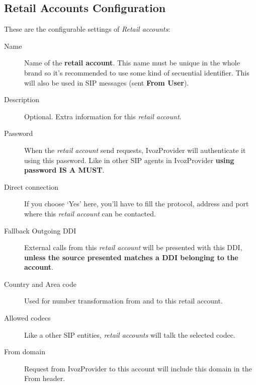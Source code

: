 \documentclass[letterpaper,10pt,english]{sphinxmanual}
\begin{document}
\subsection{Retail Accounts Configuration}
\label{retail/accounts:retail-accounts-configuration}
These are the configurable settings of \emph{Retail accounts}:
\begin{description}
\item[{Name}] \leavevmode{}\label{retail/accounts:term-name}
Name of the \textbf{retail account}. This name must be unique in the whole brand so
it's recommended to use some kind of secuential identifier. This will also be used
in SIP messages (sent \textbf{From User}).

\item[{Description}] \leavevmode{}\label{retail/accounts:term-description}
Optional. Extra information for this \emph{retail account}.

\item[{Password}] \leavevmode{}\label{retail/accounts:term-password}
When the \emph{retail account} send requests, IvozProvider will authenticate it using
this password. Like in other SIP agents in IvozProvider \textbf{using password IS A MUST}.

\item[{Direct connection}] \leavevmode{}\label{retail/accounts:term-direct-connection}
If you choose `Yes' here, you'll have to fill the protocol, address and
port where this \emph{retail account} can be contacted.

\item[{Fallback Outgoing DDI}] \leavevmode{}\label{retail/accounts:term-fallback-outgoing-ddi}
External calls from this \emph{retail account} will be presented with this DDI, \textbf{unless
the source presented matches a DDI belonging to the account}.

\item[{Country and Area code}] \leavevmode{}\label{retail/accounts:term-country-and-area-code}
Used for number transformation from and to this retail account.

\item[{Allowed codecs}] \leavevmode{}\label{retail/accounts:term-allowed-codecs}
Like a other SIP entities, \emph{retail accounts} will talk the selected codec.

\item[{From domain}] \leavevmode{}\label{retail/accounts:term-from-domain}
Request from IvozProvider to this account will include this domain in
the From header.

\end{description}
\end{document}
